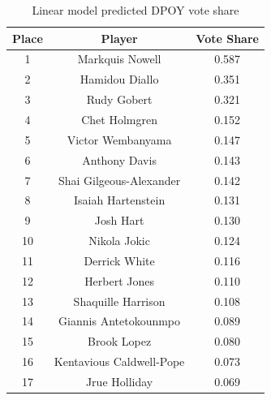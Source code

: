 \documentclass[letterpaper,titlepage]{article}
\begin{document}
    \begin{table}[H]
        \centering
        \caption{Linear model predicted DPOY vote share}
        \label{Tab:LMRes}
        \begin{tabular}{c|c|c}
            \textbf{Place} & \textbf{Player}          & \textbf{Vote Share} \\ \hline
            \rowcolor[HTML]{EFEFEF} 
            1              & Markquis Nowell          & 0.587               \\
            2              & Hamidou Diallo           & 0.351               \\
            \rowcolor[HTML]{EFEFEF} 
            3              & Rudy Gobert              & 0.321               \\
            4              & Chet Holmgren            & 0.152               \\
            \rowcolor[HTML]{EFEFEF} 
            5              & Victor Wembanyama        & 0.147               \\
            6              & Anthony Davis            & 0.143               \\
            \rowcolor[HTML]{EFEFEF} 
            7              & Shai Gilgeous-Alexander  & 0.142               \\
            8              & Isaiah Hartenstein       & 0.131               \\
            \rowcolor[HTML]{EFEFEF} 
            9              & Josh Hart                & 0.130               \\
            10             & Nikola Jokic             & 0.124               \\
            \rowcolor[HTML]{EFEFEF} 
            11             & Derrick White            & 0.116               \\
            12             & Herbert Jones            & 0.110               \\
            \rowcolor[HTML]{EFEFEF} 
            13             & Shaquille Harrison       & 0.108               \\
            14             & Giannis Antetokounmpo    & 0.089               \\
            \rowcolor[HTML]{EFEFEF} 
            15             & Brook Lopez              & 0.080               \\
            16             & Kentavious Caldwell-Pope & 0.073               \\
            \rowcolor[HTML]{EFEFEF} 
            17             & Jrue Holliday            & 0.069              
        \end{tabular}
    \end{table}
\end{document}
